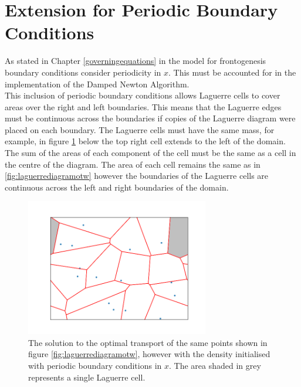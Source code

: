 \section{Extension for Periodic Boundary Conditions}
As stated in Chapter \ref{governingequations} in the model for frontogenesis boundary conditions consider periodicity in $x$. This must be accounted for in the implementation of the Damped Newton Algorithm.
\\
\linebreak
This inclusion of periodic boundary conditions allows Laguerre cells to cover areas over the right and left boundaries. This means that the Laguerre edges must be continuous across the boundaries if copies of the Laguerre diagram were placed on each boundary. The Laguerre cells must have the same mass, for example, in figure \ref{fig:laguerrediagramotpw} below the top right cell extends to the left of the domain. The sum of the areas of each component of the cell must be the same as a cell in the centre of the diagram. The area of each cell remains the same as in \ref{fig:laguerrediagramotw} however the boundaries of the Laguerre cells are continuous across the left and right boundaries of the domain.
\begin{figure}[h]
	\centering
	\includegraphics[width=8cm]{project/laguerre_diagram_OTPw}
	\caption[Optimal Transport with Periodic Boundary Conditions]{The solution to the optimal transport of the same points shown in figure \ref{fig:laguerrediagramotw}, however with the density initialised with periodic boundary conditions in $x$. The area shaded in grey represents a single Laguerre cell.}
	\label{fig:laguerrediagramotpw}
\end{figure}
